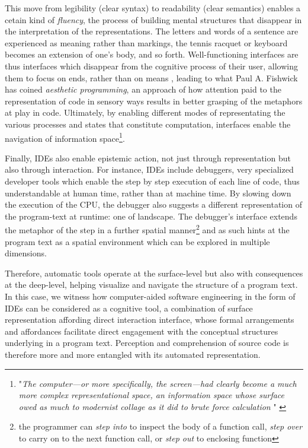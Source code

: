 This move from legibility (clear syntax) to readability (clear semantics) enables a cetain kind of \emph{fluency}, the process of building mental structures that disappear in the interpretation of the representations. The letters and words of a sentence are experienced as meaning rather than markings, the tennis racquet or keyboard becomes an extension of one's body, and so forth. Well-functioning interfaces are thus interfaces which disappear from the cognitive process of their user, allowing them to focus on ends, rather than on means \citep{galloway_interface_2012}, leading to what Paul A. Fishwick has coined \emph{aesthetic programming}, an approach of how attention paid to the representation of code in sensory ways results in better grasping of the metaphors at play in code. Ultimately, by enabling different modes of representating the various processes and states that constitute computation, interfaces enable the navigation of information space\footnote{"\emph{The computer—or more specifically, the screen—had clearly become a much more complex representational space, an information space whose surface owed as much to modernist collage as it did to brute force calculation }" \citep{kirschnbaum_colors_2004}}.

Finally, IDEs also enable epistemic action, not just through representation but also through interaction. For instance, IDEs include debuggers, very specialized developer tools which enable the step by step execution of each line of code, thus understandable at human time, rather than at machine time. By slowing down the execution of the CPU, the debugger also suggests a different representation of the program-text at runtime: one of landscape. The debugger's interface extends the metaphor of the step in a further spatial manner\footnote{the programmer can \emph{step into} to inspect the body of  a function call, \emph{step over} to carry on to the next function call, or \emph{step out} to enclosing function} and as such hints at the program text as a spatial environment which can be explored in multiple dimensions. 

Therefore, automatic tools operate at the surface-level but also with consequences at the deep-level, helping visualize and navigate the structure of a program text. In this case, we witness how computer-aided software engineering in the form of IDEs can be considered as a cognitive tool, a combination of surface representation affording direct interaction  interface, whose formal arrangements and affordances facilitate direct engagement with the conceptual structures underlying in a program text. Perception and comprehension of source code is therefore more and more entangled with its automated representation.

